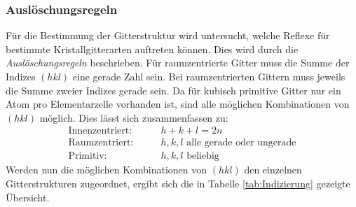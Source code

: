 \documentclass[a4paper,twoside,final]{article}
\begin{document}
\subsubsection{Auslöschungsregeln}\label{sec:Auslöschungsregeln}
Für die Bestimmung der Gitterstruktur wird untersucht, welche Reflexe für bestimmte Kristallgitterarten auftreten können. Dies wird durch die \textit{Auslöschungsregeln} beschrieben. Für raumzentrierte Gitter muss die Summe der Indizes $(hkl)$ eine gerade Zahl sein. Bei raumzentrierten Gittern muss jeweils die Summe zweier Indizes gerade sein. Da für kubisch primitive Gitter nur ein Atom pro Elementarzelle vorhanden ist, sind alle möglichen Kombinationen von $(hkl)$ möglich. Dies lässt sich zusammenfassen zu:
\begin{align}
  \text{Innenzentriert:} & \qquad h + k +l = 2n\nonumber\\
  \text{Raumzentriert:}  & \qquad h, k, l \text{ alle gerade oder ungerade}\\
  \text{Primitiv:} & \qquad h, k, l \text{ beliebig}\nonumber
\end{align}
Werden nun die möglichen Kombinationen von $(hkl)$ den einzelnen Gitterstrukturen zugeordnet, ergibt sich die in Tabelle \ref{tab:Indizierung} gezeigte Übersicht.
\end{document}
